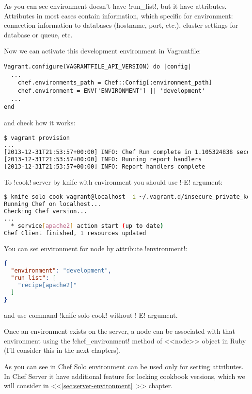 As you can see environment doesn't have \inline!run_list!, but it have attributes. Attributes in most cases contain information, which specific for environment: connection information to databases (hostname, port, etc.), cluster settings for database or queue, etc.

Now we can activate this development environment in Vagrantfile:

\begin{lstlisting}[label=lst:my-cloud-chef-environment2,title=my-cloud/Vagrantfile]
Vagrant.configure(VAGRANTFILE_API_VERSION) do |config|
  ...
    chef.environments_path = Chef::Config[:environment_path]
    chef.environment = ENV['ENVIRONMENT'] || 'development'
  ...
end
\end{lstlisting}

and check how it works:

\begin{lstlisting}[language=Bash,label=lst:my-cloud-chef-environment3]
$ vagrant provision
...
[2013-12-31T21:53:57+00:00] INFO: Chef Run complete in 1.105324838 seconds
[2013-12-31T21:53:57+00:00] INFO: Running report handlers
[2013-12-31T21:53:57+00:00] INFO: Report handlers complete
\end{lstlisting}

To \inline!cook! server by knife with environment you should use \inline!-E! argument:

\begin{lstlisting}[language=Bash,label=lst:my-cloud-chef-environment4]
$ knife solo cook vagrant@localhost -i ~/.vagrant.d/insecure_private_key -p 2222 -N web1.example.com -E development
Running Chef on localhost...
Checking Chef version...
...
  * service[apache2] action start (up to date)
Chef Client finished, 1 resources updated
\end{lstlisting}

You can set environment for node by attribute \inline!environment!:

\begin{lstlisting}[language=JSON,label=lst:my-cloud-chef-environment5,title=my-cloud/nodes/web1.example.com.json]
{
  "environment": "development",
  "run_list": [
    "recipe[apache2]"
  ]
}
\end{lstlisting}

and use command \inline!knife solo cook! without \inline!-E! argument.

Once an environment exists on the server, a node can be associated with that environment using the \inline!chef_environment! method of <<node>> object in Ruby (I'll consider this in the next chapters).

As you can see in Chef Solo environment can be used only for setting attributes. In Chef Server it have additional feature for locking cookbook versions, which we will consider in <<\ref{sec:server-environment}~>> chapter.
